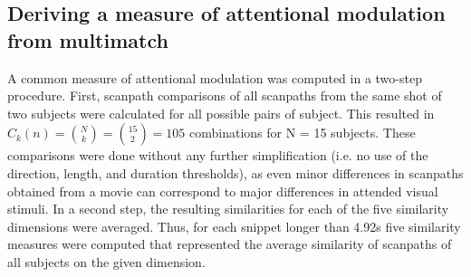 \documentclass[a4paper, 12pt]{scrreprt}
\begin{document}
{\subsection{Deriving a measure of attentional modulation from multimatch}
A common measure of attentional modulation was computed in a two-step procedure. First, scanpath comparisons of all scanpaths from the same shot of two subjects were calculated for all possible pairs of subject. This resulted in $C_k(n) = {N\choose k} = {15\choose 2} = 105$ combinations for N = 15 subjects. These comparisons were done without any further simplification (i.e. no use of the direction, length, and duration thresholds), as even minor differences in scanpaths obtained from a movie can correspond to major differences in attended visual stimuli. In a second step, the resulting similarities for each of the five similarity dimensions were averaged. Thus, for each snippet longer than 4.92s five similarity measures were computed that represented the average similarity of scanpaths of all subjects on the given dimension. 

}
\end{document}
